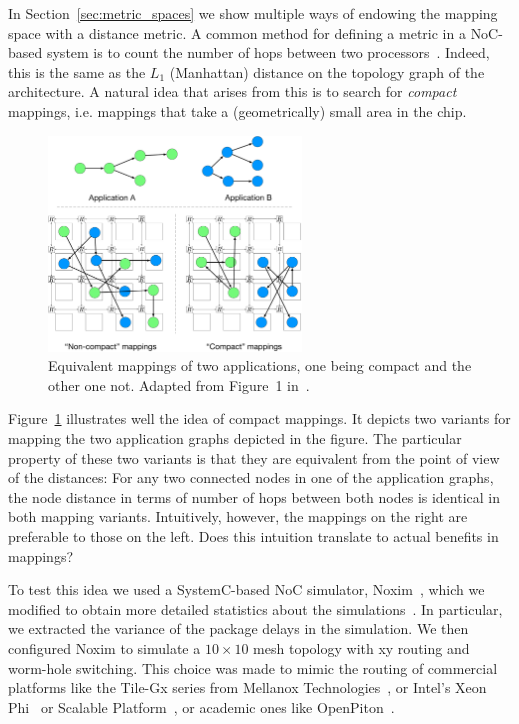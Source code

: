 In Section~\ref{sec:metric_spaces} we show multiple ways of endowing the mapping space with a distance metric.
A common method for defining a metric in a \ac{NoC}-based system is to count the number of hops between two processors~\cite{singh2010communication,schwarzer2017symmetry}.
Indeed, this is the same as the $L_1$ (Manhattan) distance on the topology graph of the architecture.
A natural idea that arises from this is to search for \emph{compact} mappings, i.e. mappings that take a (geometrically) small area in the chip.


\begin{figure}[th]
	\centering
	\includegraphics[width=0.6\textwidth]{figures/compact_intro.pdf}
	\caption{Equivalent mappings of two applications, one being compact and the other one not. Adapted from Figure~1 in~\cite{goens_samos19}.}
	\label{fig:compact_intro}
\end{figure}

Figure~\ref{fig:compact_intro} illustrates well the idea of compact mappings.
It depicts two variants for mapping the two application graphs depicted in the figure.
The particular property of these two variants is that they are equivalent from the point of view of the distances:
For any two connected nodes in one of the application graphs, the node distance in terms of number of hops between both nodes is identical in both mapping variants.
Intuitively, however, the mappings on the right are preferable to those on the left. 
Does this intuition translate to actual benefits in mappings?

To test this idea we used a SystemC-based \ac{NoC} simulator, Noxim~\cite{noxim}, which we modified to obtain more detailed statistics about the simulations~\cite{goens_samos19}.
In particular, we extracted the variance of the package delays in the simulation. 
We then configured Noxim to simulate a $10 \times 10$ mesh topology with xy routing and worm-hole switching. 
This choice was made to mimic the routing of commercial platforms like the Tile-Gx series from Mellanox Technologies~\cite{technologies2015-tile-gx36-processor,technologies2015-tile-gx72-processor}, or Intel's Xeon Phi~\cite{tam2018-skylake-sp} or Scalable Platform~\cite{sodani2016-knights-landing}, or academic ones like OpenPiton~\cite{balkind2016-openpiton}.

